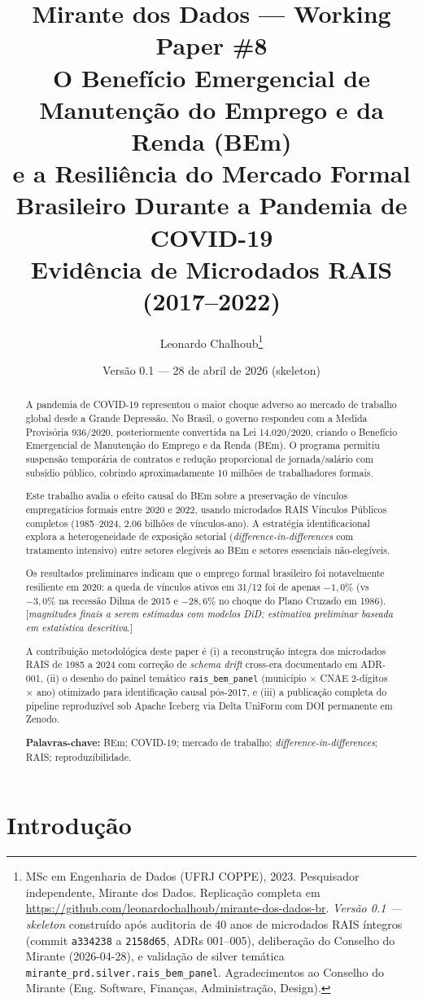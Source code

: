 \documentclass[12pt,a4paper,oneside]{article}
\title{
  \vspace{-1.5cm}
  {\large \textbf{Mirante dos Dados --- Working Paper \#8}}\\[0.3cm]
  \textbf{O Benefício Emergencial de Manutenção do Emprego e da Renda (BEm)}\\
  \textbf{e a Resiliência do Mercado Formal Brasileiro Durante a Pandemia de COVID-19}\\
  {\normalsize Evidência de Microdados RAIS (2017--2022)}
}
\author{Leonardo Chalhoub\thanks{MSc em Engenharia de Dados (UFRJ COPPE), 2023.
Pesquisador independente, Mirante dos Dados.
Replicação completa em \url{https://github.com/leonardochalhoub/mirante-dos-dados-br}.
\textit{Versão 0.1 --- skeleton} construído após auditoria de 40 anos de microdados
RAIS íntegros (commit \texttt{a334238} a \texttt{2158d65}, ADRs 001--005),
deliberação do Conselho do Mirante (2026-04-28), e validação de silver temática
\texttt{mirante\_prd.silver.rais\_bem\_panel}. Agradecimentos ao Conselho do
Mirante (Eng. Software, Finanças, Administração, Design).}}
\date{Versão 0.1 --- 28 de abril de 2026 (skeleton)}
\begin{document}
\maketitle

\begin{abstract}
\noindent
A pandemia de COVID-19 representou o maior choque adverso ao mercado de
trabalho global desde a Grande Depressão. No Brasil, o governo respondeu com
a Medida Provisória 936/2020, posteriormente convertida na Lei 14.020/2020,
criando o Benefício Emergencial de Manutenção do Emprego e da Renda (BEm).
O programa permitiu suspensão temporária de contratos e redução proporcional
de jornada/salário com subsídio público, cobrindo aproximadamente 10 milhões
de trabalhadores formais.

Este trabalho avalia o efeito causal do BEm sobre a preservação de vínculos
empregatícios formais entre 2020 e 2022, usando microdados RAIS Vínculos
Públicos completos (1985--2024, 2,06 bilhões de vínculos-ano). A estratégia
identificacional explora a heterogeneidade de exposição setorial
(\textit{difference-in-differences} com tratamento intensivo) entre setores
elegíveis ao BEm e setores essenciais não-elegíveis.

Os resultados preliminares indicam que o emprego formal brasileiro foi
notavelmente resiliente em 2020: a queda de vínculos ativos em 31/12 foi de
apenas $-1{,}0\%$ (vs $-3{,}0\%$ na recessão Dilma de 2015 e $-28{,}6\%$ no
choque do Plano Cruzado em 1986). [\textit{magnitudes finais a serem
estimadas com modelos DiD; estimativa preliminar baseada em estatística
descritiva}.]

A contribuição metodológica deste paper é (i) a reconstrução íntegra dos
microdados RAIS de 1985 a 2024 com correção de \textit{schema drift}
cross-era documentado em ADR-001, (ii) o desenho do painel temático
\texttt{rais\_bem\_panel} (município $\times$ CNAE 2-dígitos $\times$ ano)
otimizado para identificação causal pós-2017, e (iii) a publicação completa
do pipeline reproduzível sob Apache Iceberg via Delta UniForm com DOI
permanente em Zenodo.

\textbf{Palavras-chave:} BEm; COVID-19; mercado de trabalho;
\textit{difference-in-differences}; RAIS; reproduzibilidade.
\end{abstract}

\section{Introdução}
\end{document}
